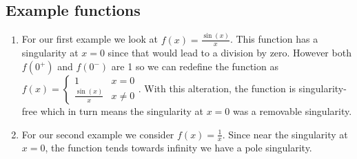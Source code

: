 \documentclass[journal]{IEEEtran}
\begin{document}
\subsection{Example functions}
\begin{enumerate}
\item For our first example we look at $f(x) = \frac{\sin(x)}{x}$. This function has a singularity at $x = 0$ since that would lead to a division by zero. However both $f(0^+)$ and $f(0^-)$ are 1 so we can redefine the function as $f(x) = \begin{cases} 1 & x = 0\\ \frac{\sin(x)}{x} & x \ne 0\end{cases}$. With this alteration, the function is singularity-free which in turn means the singularity at $x = 0$ was a removable singularity.

\begin{figure}
    \centering
{}
\end{figure}

\item For our second example we consider $f(x) = \frac{1}{x}$. Since near the singularity at $x = 0$, the function tends towards infinity we have a pole singularity.
\begin{figure}
\centering
{}
\end{figure}


\end{enumerate}
\end{document}
